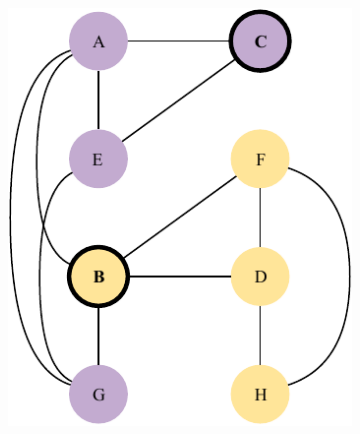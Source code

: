 \documentclass[a4paper, 10pt]{article}
\begin{document}
\begin{figure}[H]
\begin{subfigure}{0.19\textwidth}
        \includegraphics[width=1\linewidth]{5_22.pdf}
    \end{subfigure}
    \hfill
    \begin{subfigure}{0.19\textwidth}
        \centering

\end{subfigure}
\end{figure}
\end{document}
